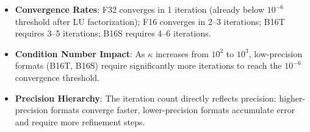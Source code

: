 \documentclass[11pt,a4paper]{article}
\begin{document}
\begin{itemize}
  \item \textbf{Convergence Rates}: F32 converges in 1 iteration (already below $10^{-6}$ threshold after LU factorization); F16 converges in 2--3 iterations; B16T requires 3--5 iterations; B16S requires 4--6 iterations.
  \item \textbf{Condition Number Impact}: As $\kappa$ increases from $10^2$ to $10^3$, low-precision formats (B16T, B16S) require significantly more iterations to reach the $10^{-6}$ convergence threshold.
  \item \textbf{Precision Hierarchy}: The iteration count directly reflects precision: higher-precision formats converge faster, lower-precision formats accumulate error and require more refinement steps.
\end{itemize}
\end{document}
